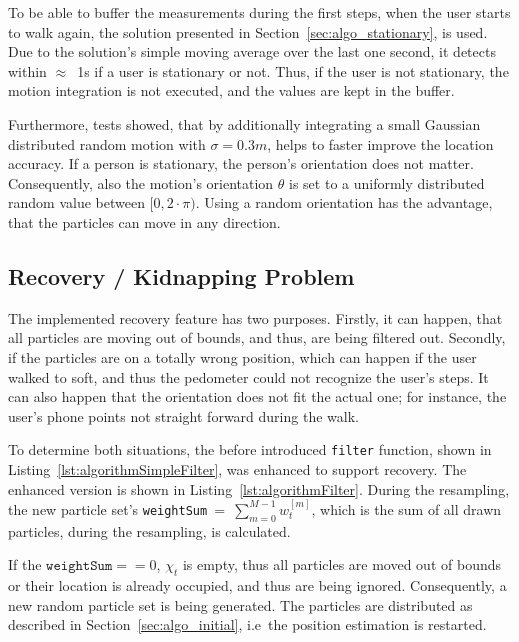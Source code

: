 To be able to buffer the measurements during the first steps, when the user starts to walk again, the solution presented in Section~\ref{sec:algo_stationary}, is used. Due to the solution's simple moving average over the last one second, it detects within $\approx$~1s if a user is stationary or not. Thus, if the user is not stationary, the motion integration is not executed, and the values are kept in the buffer.

Furthermore, tests showed, that by additionally integrating a small Gaussian distributed random motion with $\sigma = 0.3m$, helps to faster improve the location accuracy. If a person is stationary, the person's orientation does not matter. Consequently, also the motion's orientation $\theta$ is set to a uniformly distributed random value between $[0, 2 \cdot \pi)$. Using a random orientation has the advantage, that the particles can move in any direction.




\subsection{Recovery / Kidnapping Problem}\label{sec:algo_recovery}
The implemented recovery feature has two purposes. Firstly, it can happen, that all particles are moving out of bounds, and thus, are being filtered out. Secondly, if the particles are on a totally wrong position, which can happen if the user walked to soft, and thus the pedometer could not recognize the user's steps. It can also happen that the orientation does not fit the actual one; for instance, the user's phone points not straight forward during the walk.

To determine both situations, the before introduced \texttt{filter} function, shown in Listing~\ref{lst:algorithmSimpleFilter}, was enhanced to support recovery. The enhanced version is shown in Listing~\ref{lst:algorithmFilter}. During the resampling, the new particle set's \texttt{weightSum}~=~$\sum_{m = 0}^{M-1} w^{[m]}_t$, which is the sum of all drawn particles, during the resampling, is calculated.

If the $\texttt{weightSum} == 0$, $\chi_t$ is empty, thus all particles are moved out of bounds or their location is already occupied, and thus are being ignored. Consequently, a new random particle set is being generated. The particles are distributed as described in Section~\ref{sec:algo_initial}, i.e\ the position estimation is restarted.

